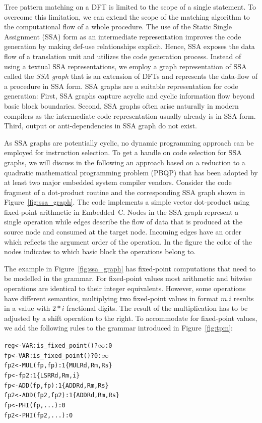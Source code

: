 Tree pattern matching on a DFT is limited to the scope of a single
statement.  To overcome this limitation, we can extend the scope of
the matching algorithm to the computational flow of a whole procedure.
The use of the Static Single Assignment (SSA) form as an intermediate
representation improves the code generation by making def-use
relationships explicit. Hence, SSA exposes the data flow of a
translation unit and utilizes the code generation process.  Instead of
using a textual SSA representations, we employ a graph representation
of SSA called the \emph{SSA graph} that is an extension of DFTs and
represents the data-flow of a procedure in SSA form.  SSA graphs are a
suitable representation for code generation: First, SSA graphs capture
acyclic and cyclic information flow beyond basic block
boundaries. Second, SSA graphs often arise naturally in modern
compilers as the intermediate code representation usually already is
in SSA form. Third, output or anti-dependencies in SSA graph do not
exist.

As SSA graphs are potentially cyclic, no dynamic programming approach
can be employed for instruction selection.  To get a handle on code
selection for SSA graphs, we will discuss in the following an approach
based on a reduction to a quadratic mathematical programming problem
(PBQP) that has been adopted by at least two major embedded system
compiler vendors.  Consider the code fragment of a dot-product routine
and the corresponding SSA graph shown in Figure~\ref{fig:ssa_graph}.
The code implements a simple vector dot-product using fixed-point
arithmetic in Embedded~C.  Nodes in the SSA graph represent a single
operation while edges describe the flow of data that is produced at the
source node and consumed at the target node. Incoming edges
have an order which reflects the argument order of the operation. In
the figure the color of the nodes indicates to which basic block the
operations belong to.

The example in Figure~\ref{fig:ssa_graph} has fixed-point computations
that need to be modelled in the grammar. For fixed-point values most
arithmetic and bitwise operations are identical to their integer
equivalents. However, some operations have different semantics, \eg
multiplying two fixed-point values in format $m.i$ results in a value
with $2*i$ fractional digits. The result of the multiplication has to
be adjusted by a shift operation to the right. To accommodate for
fixed-point values, we add the following rules to the grammar
introduced in Figure~\ref{fig:tpm}:
\begin{alltt}
   reg <- VAR : is\_fixed_point() ? \(\infty\) : 0
   fp  <- VAR : is\_fixed_point() ? 0 : \(\infty\)
   fp2 <- MUL(fp, fp)   : 1   \{ MUL Rd, Rm, Rs \}
   fp  <- fp2           : 1   \{ LSR Rd, Rm, i  \}
   fp  <- ADD(fp, fp)   : 1   \{ ADD Rd, Rm, Rs \}
   fp2 <- ADD(fp2, fp2) : 1   \{ ADD Rd, Rm, Rs \}
   fp  <- PHI(fp, ...) : 0 
   fp2 <- PHI(fp2, ...) : 0 
\end{alltt}

